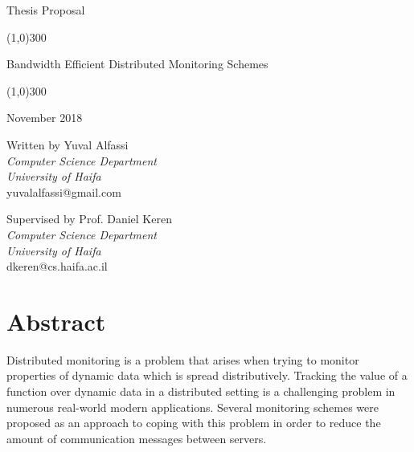 \documentclass[11pt, conference]{article}
\begin{document}
	\begin{titlepage}
		\begin{center}
			\vspace*{1cm}
			\begin{Huge}
				Thesis Proposal \\
			\end{Huge}
			\vspace{1cm}
			\line(1,0){300} \\
			\vspace{0.2cm}
			\begin{Huge}
				Bandwidth Efficient Distributed Monitoring Schemes \\
			\end{Huge}
			\line(1,0){300} \\
			\vspace{1.5cm}
			\begin{Large}
				November 2018 \\
			\end{Large}
			\vspace{1.5cm}
			\begin{large}
				Written by Yuval Alfassi \\
				\textit{Computer Science Department} \\
				\textit{University of Haifa} \\
				yuvalalfassi@gmail.com \\
			\end{large}
			\vspace{2cm}
			\begin{large}
				Supervised by Prof. Daniel Keren \\
				\textit{Computer Science Department} \\
				\textit{University of Haifa} \\
				dkeren@cs.haifa.ac.il \\
			\end{large}
		\end{center}
	\end{titlepage}


\section*{Abstract}

Distributed monitoring is a problem that arises when trying to monitor properties of dynamic data which is spread distributively. Tracking the value of a function over dynamic data in a distributed setting is a challenging problem in numerous real-world modern applications. Several monitoring schemes were proposed as an approach to coping with this problem in order to reduce the amount of communication messages between servers.
\end{document}
